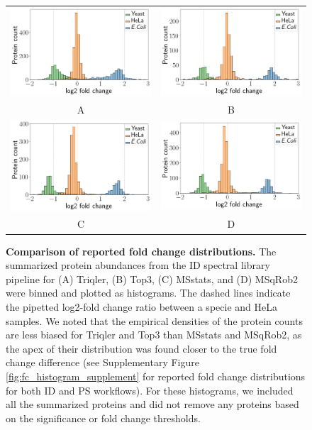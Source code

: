 \documentclass[10pt,letterpaper]{article}
\begin{document}
\begin{figure}[hbt]
    \centering
    \begin{tabular}{cc}
	    \includegraphics[width=0.4\linewidth]{../../result/report_plots_pipeline/histogram_ID_triqler.png} & 
	    \includegraphics[width=0.4\linewidth]{../../result/report_plots_pipeline/histogram_ID_top3.png} \\ 
        A & B \\ 
	    \includegraphics[width=0.4\linewidth]{../../result/report_plots_pipeline/histogram_ID_msstats.png} & 
	    \includegraphics[width=0.4\linewidth]{../../result/report_plots_pipeline/histogram_ID_msqrob2.png} \\
        C & D 
    \end{tabular}
    \caption{{\bf Comparison of reported fold change distributions.} The summarized protein abundances from the ID spectral library pipeline for (A) Triqler, (B) Top3, (C) MSstats, and (D) MSqRob2 were binned and plotted as histograms. The dashed lines indicate the pipetted log2-fold change ratio between a specie and HeLa samples. We noted that the empirical densities of the protein counts are less biased for Triqler and Top3 than MSstats and MSqRob2, as the apex of their distribution was found closer to the true fold change difference (see Supplementary Figure \ref{fig:fc_histogram_supplement} for reported fold change distributions for both ID and PS workflows). For these histograms, we included all the summarized proteins and did not remove any proteins based on  the significance or fold change thresholds. \label{fig:fc_histogram}}
\end{figure}
\end{document}

